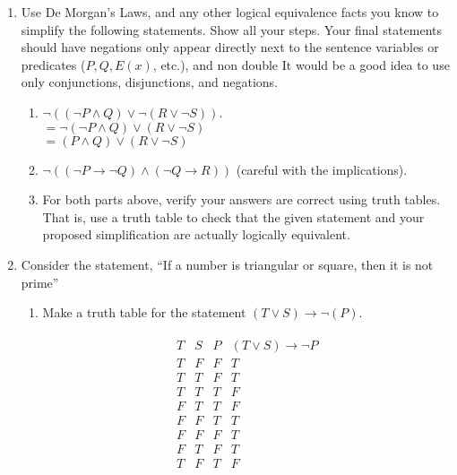 \documentclass[11pt,a4paper]{article}
\newcommand\setItemNumber[1]{\setcounter{enumi}{\numexpr#1-1\relax}}
\begin{document}
\begin{enumerate}
        \setItemNumber{9}
        \item Use De Morgan’s Laws, and any other logical equivalence facts you know to simplify the following statements. Show all your steps. Your final statements should have negations only appear directly next to the sentence variables or predicates ($P, Q, E(x)$, etc.), and non double It would be a good idea to use only conjunctions, disjunctions, and negations.
            \begin{enumerate}
                \item $\neg((\neg P\land Q)\lor \neg(R\lor\neg S))$.\\
                    $ = \neg(\neg P\land Q) \lor (R\lor\neg S)$\\
                    $ = (P\land Q)\lor(R\lor \neg S)$
                \item $\neg((\neg P\rightarrow\neg Q) \land(\neg Q\rightarrow R))$ (careful with the implications).
                \item For both parts above, verify your answers are correct using truth tables. That is, use a truth table to check that the given statement and your proposed simplification are actually logically equivalent.
            \end{enumerate}

        \item Consider the statement, “If a number is triangular or square, then it is not prime”
            \begin{enumerate}
                \item Make a truth table for the statement $(T\lor S)\rightarrow\neg(P)$.

                \begin{align*}
                    \begin{array}{|c|c|c|c|}
                        T & S & P & (T\lor S)\rightarrow \neg P\\
                    \hline
                    T & F & F & T\\
                    T & T & F & T\\
                    T & T & T & F\\
                    F & T & T & F\\
                    F & F & T & T\\
                    F & F & F & T\\
                    F & T & F & T\\
                    T & F & T & F\\
                    \end{array}
                \end{align*}


\end{enumerate}
\end{enumerate}
\end{document}
